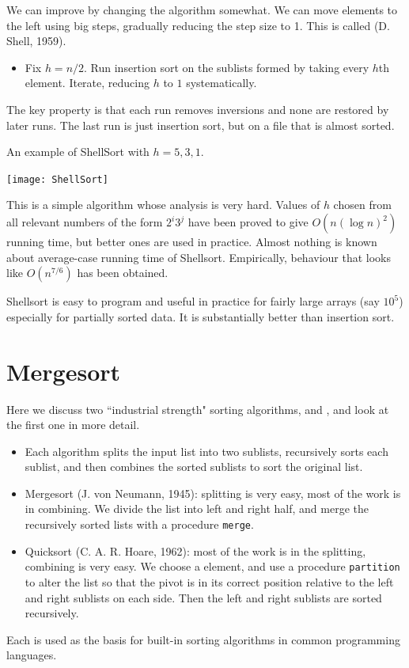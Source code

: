 We can improve by changing the algorithm somewhat.
We can move elements to the left using big steps, gradually reducing the 
step size to 1. This is called  (D. Shell, 1959). 
\begin{itemize}
  \item Fix $h = n/2$. Run insertion sort on the sublists formed by taking 
every $h$th element. Iterate, reducing $h$ to $1$ systematically. 
\end{itemize}
The key property is that each run removes inversions and none are 
restored by later runs. The last run is just insertion sort, but on a file that 
is almost sorted.

\begin{Boxample}
An example of ShellSort with $h = 5, 3, 1$.
\begin{center}
  \texttt{[image: ShellSort]} 
\end{center}
\end{Boxample}

This is a simple algorithm whose analysis is very hard. 
Values of $h$ chosen from all relevant numbers of the form $2^i 3^j$ have been proved to give 
$O(n (\log n)^2)$ running time, but better ones are used in practice. 
Almost nothing is known about average-case running time of Shellsort. 
Empirically, behaviour that looks like $O(n^{7/6})$ has been obtained. 

Shellsort is easy to program and useful in practice for fairly large arrays (say $10^5$) especially for partially sorted data. 
It is substantially  better than insertion sort.


\chapter{Mergesort}  %
\label{sec:mergesort}
Here we discuss two ``industrial strength" sorting algorithms,  and , and look at the first one in more detail.
\begin{itemize}
\item Each algorithm splits the input list into two sublists, 
recursively sorts each sublist, and then combines the sorted sublists to sort 
the original list.
\item Mergesort (J. von Neumann, 1945): splitting is very easy, most 
of the work is in combining. 
We divide the list into left and right half, and merge the recursively sorted 
lists with a procedure \texttt{merge}. 
\item Quicksort (C. A. R. Hoare, 1962): most of the work is in the 
splitting, combining is very easy. We choose a  element, and use a 
procedure \texttt{partition} to alter the list so that the pivot is in its 
correct position relative to the left and right sublists on each side. Then the left and right sublists 
are sorted recursively.
\end{itemize}
Each is used as the basis for 
built-in sorting algorithms in common programming languages.

